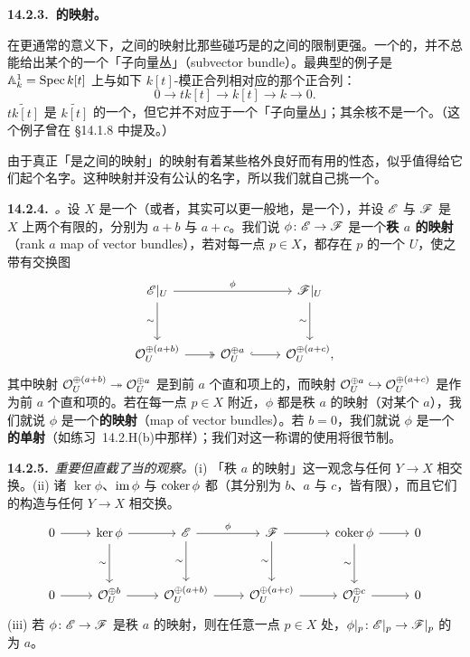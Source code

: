 \textbf{14.2.3.\ \trVectorBundle{}的映射。}

在更通常的意义下，\trVectorBundle{}之间的映射比那些碰巧是\trLocallyFreeSheaf{}的\trQCSheaf{}之间的\trMorphism{}限制更强。一个\trLocallyFreeSheaf{}的\trLocallyFree\trSubsheaf，并不总能给出某个\trVectorBundle{}的一个「子向量丛」（subvector bundle）。最典型的例子是 $\mathbb{A}^1_k=\operatorname{Spec} k[t]$ 上与如下 $k[t]$-模正合列相对应的那个\trQCSheaf{}正合列：
\begin{equation*}\tag{14.2.3.1}\label{eq:tk-k-modules-exact}
0\longrightarrow tk[t]\longrightarrow k[t]\longrightarrow k\longrightarrow 0.
\end{equation*}
\trLocallyFreeSheaf $\widetilde{tk[t]}$ 是 $\widetilde{k[t]}$ 的一个\trSubsheaf，但它并不对应于一个「子向量丛」；其余核不是一个\trVectorBundle。（这个例子曾在 \S14.1.8 中提及。）

由于真正「是\trVectorBundle{}之间的映射」的\trLocallyFreeSheaf{}映射有着某些格外良好而有用的性态，似乎值得给它们起个名字。这种映射并没有公认的名字，所以我们就自己挑一个。

\textbf{14.2.4.}\ \emph{\trhDefinition{}。}\quad 设 $X$ 是一个\trScheme（或者，其实可以更一般地，是一个\trRingedSpace），并设 $\mathscr{E}$ 与 $\mathscr{F}$ 是 $X$ 上两个有限\trRank{}的\trLocallyFreeSheaf，\trRank{}分别为 $a+b$ 与 $a+c$。我们说 $\phi\colon\mathscr{E}\to\mathscr{F}$ 是一个\textbf{秩 $a$ 的\trVectorBundle{}映射}（rank $a$ map of vector bundles），若对每一点 $p\in X$，都存在 $p$ 的一个\trOpen\trNeighborhood{} $U$，使之带有交换图
\[
\begin{tikzcd}[row sep=3em]
\scr{E}|_U \ar[d, "\sim"'] \ar[rr, "\phi"] & & \scr{F}|_U \ar[d, "\sim"'] \\
\OO_U^{\oplus(a+b)} \ar[r, two heads] & \OO_U^{\oplus a} \ar[r, hook] & {\OO_U^{\oplus(a+c)},}
\end{tikzcd}
\]
其中映射 $\mathcal{O}_U^{\oplus(a+b)}\twoheadrightarrow\mathcal{O}_U^{\oplus a}$ 是到前 $a$ 个直和项上的\trProjection，而映射 $\mathcal{O}_U^{\oplus a}\hookrightarrow\mathcal{O}_U^{\oplus(a+c)}$ 是作为前 $a$ 个直和项的\trInclusionMap。若在每一点 $p\in X$ 附近，$\phi$ 都是秩 $a$ 的\trVectorBundle{}映射（对某个 $a$），我们就说 $\phi$ 是一个\textbf{\trVectorBundle{}的映射}（map of vector bundles）。若 $b=0$，我们就说 $\phi$ 是一个\textbf{\trVectorBundle{}的单射}（如\mbox{练习~14.2.H(b)}中那样）；我们对这一称谓的使用将很节制。

\textbf{14.2.5.}\ \emph{重要但直截了当的观察。}\quad (i) 「秩 $a$ 的\trVectorBundle{}映射」这一观念与任何\trBaseChange{} $Y\to X$ 相交换。(ii) 诸\trQCSheaf{} $\ker\phi$、$\operatorname{im}\phi$ 与 $\operatorname{coker}\phi$ 都\trLocallyFree（其\trRank{}分别为 $b$、$a$ 与 $c$，皆有限），而且它们的构造与任何\trBaseChange{} $Y\to X$ 相交换。
\[
\begin{tikzcd}[row sep=3em, column sep=2.4em]
0 \ar[r] & \ker\phi \ar[r] \ar[d, "\sim"'] & \scr{E} \ar[r, "\phi"] \ar[d, "\sim"'] & \scr{F} \ar[r] \ar[d, "\sim"'] & \coker\phi \ar[r] \ar[d, "\sim"'] & 0 \\
0 \ar[r] & \OO_U^{\oplus b} \ar[r] & \OO_U^{\oplus(a+b)} \ar[r] & \OO_U^{\oplus(a+c)} \ar[r] & \OO_U^{\oplus c} \ar[r] & 0
\end{tikzcd}
\]
(iii) 若 $\phi\colon\mathscr{E}\to\mathscr{F}$ 是秩 $a$ 的\trVectorBundle{}映射，则在任意一点 $p\in X$ 处，$\phi|_p\colon\mathscr{E}|_p\to\mathscr{F}|_p$ 的\trRank{}为 $a$。

